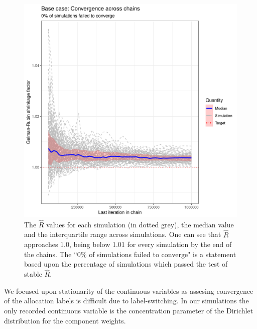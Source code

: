 \documentclass[]{article}
\begin{document}
\begin{figure} %
	\centering
	\includegraphics[scale=0.65]{./Images/Simulations/Convergence/base_caseConvergenceAcrossChains.png}
	\caption{The $\hat{R}$ values for each simulation (in dotted grey), the median value and the interquartile range across simulations. One can see that $\hat{R}$ approaches 1.0, being below 1.01 for every simulation by the end of the chains. The ``0\% of simulations failed to converge" is a statement based upon the percentage of simulations which passed the test of stable $\hat{R}$.}
	\label{fig:simBaseCaseRhat}
\end{figure}

We focused upon stationarity of the continuous variables as assesing convergence of the allocation labels is difficult due to label-switching. In our simulations the only recorded continuous variable is the concentration parameter of the Dirichlet distribution for the component weights. 
\end{document}
